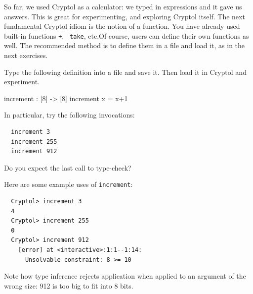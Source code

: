 So far, we used Cryptol as a calculator: we typed in expressions and
it gave us answers. This is great for experimenting, and exploring
Cryptol itself. The next fundamental Cryptol idiom is the notion of a
function. You have already used built-in functions {\tt +}, {\tt
  take}, etc.{\indPlus\indLg}Of course, users can define their own
functions as well. The recommended method is to define them in a file
and load it, as in the next exercises.


\begin{Exercise}\label{ex:fn:0}
  Type the following definition into a file and save it. Then load it
  in Cryptol and experiment.
\begin{code}
  increment : [8] -> [8]
  increment x = x+1
\end{code}
In particular, try the following invocations:
\begin{Verbatim}
  increment 3
  increment 255
  increment 912
\end{Verbatim}
Do you expect the last call to type-check?
\end{Exercise}
\begin{Answer}
Here are some example uses of {\tt increment}:
\begin{Verbatim}
  Cryptol> increment 3
  4
  Cryptol> increment 255
  0
  Cryptol> increment 912
    [error] at <interactive>:1:1--1:14:
      Unsolvable constraint: 8 >= 10
\end{Verbatim}
Note how type inference rejects application when applied to an
argument of the wrong size: 912 is too big to fit into 8 bits.
\end{Answer}

\indFunApp

